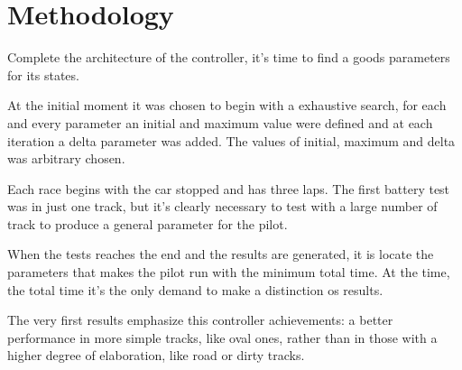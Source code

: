 \section{Methodology}
	Complete the architecture of the controller, it's time to find a goods parameters for its states.
	
	At the initial moment it was chosen to begin with a exhaustive search, for each and every parameter an initial and maximum value were defined and at each iteration a delta parameter was added. The values of initial, maximum and delta was arbitrary chosen.
	
	
	Each race begins with the car stopped and has three laps. The first battery test was in just one track, but it's clearly necessary to test with a large number of track to produce a general parameter for the pilot.
	
	When the tests reaches the end and the results are generated, it is locate the parameters that makes the pilot run with the minimum total time. At the time, the total time it's the only demand to make a distinction os results.
	
	The very first results emphasize
	this controller achievements: a better performance in more simple tracks, like oval ones, rather than in those with a higher degree of elaboration, like road or dirty tracks.